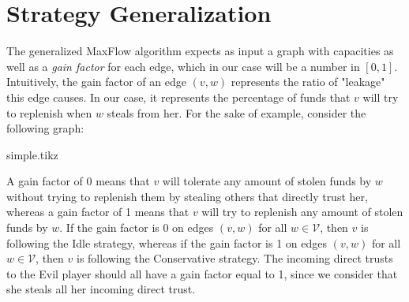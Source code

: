 \section{Strategy Generalization}
  The generalized MaxFlow algorithm expects as input a graph with capacities as well as a \textit{gain factor} for each edge,
  which in our case will be a number in $\left[0, 1\right]$. Intuitively, the gain factor of an edge $\left(v, w\right)$
  represents the ratio of "leakage" this edge causes. In our case, it represents the percentage of funds that $v$ will try to
  replenish when $w$ steals from her. For the sake of example, consider the following graph:
  
  {simple.tikz}
  
  A gain factor of 0 means that $v$ will tolerate any amount of stolen funds by $w$ without trying to replenish them by stealing
  others that directly trust her, whereas a gain factor of 1 means that $v$ will try to replenish any amount of stolen funds by
  $w$. If the gain factor is 0 on edges $\left(v, w\right)$ for all $w \in \mathcal{V}$, then $v$ is following the Idle
  strategy, whereas if the gain factor is 1 on edges $\left(v, w\right)$ for all $w \in \mathcal{V}$, then $v$ is following the
  Conservative strategy. The incoming direct trusts to the Evil player should all have a gain factor equal to 1, since we
  consider that she steals all her incoming direct trust.
